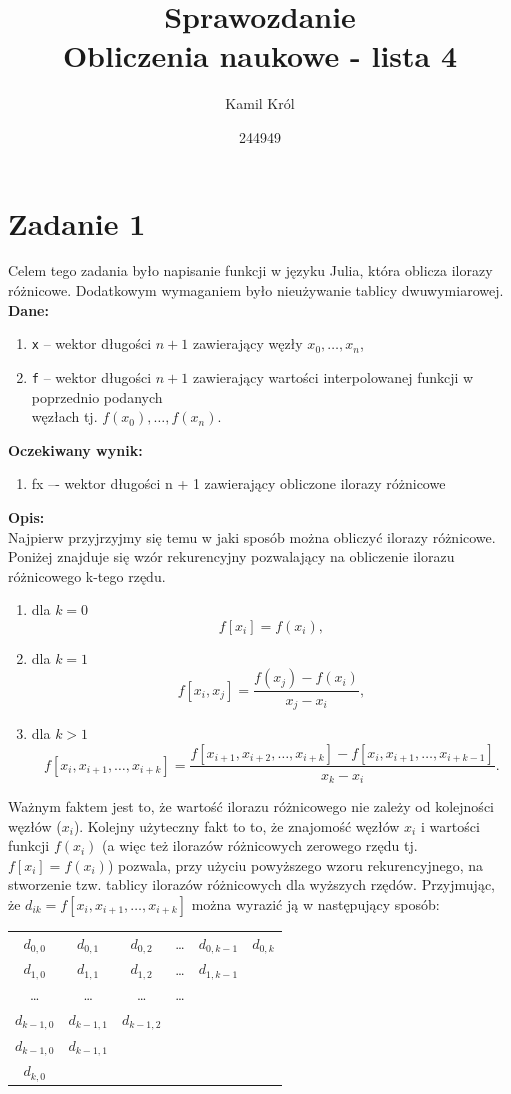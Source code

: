 \documentclass[]{article}
\title{
	Sprawozdanie \\
	\large 
	Obliczenia naukowe - lista 4}
\author{Kamil Król}
\date{244949}
\begin{document}
	
	\maketitle
	
	\section*{Zadanie 1}
	Celem tego zadania było napisanie funkcji w języku Julia, która oblicza ilorazy różnicowe. Dodatkowym wymaganiem było nieużywanie tablicy dwuwymiarowej.\\
	\textbf{Dane:}
	\begin{enumerate}[]
		\item \texttt{x} -- wektor długości $n+1$ zawierający węzły $x_0, \ldots, x_n$,
		\item \texttt{f} -- wektor długości $n+1$ zawierający wartości interpolowanej funkcji w poprzednio podanych\\ węzłach tj. $f(x_0), \ldots, f(x_n)$.
	\end{enumerate}
	\textbf{Oczekiwany wynik:}
	\begin{enumerate}[]
		\item fx –- wektor długości n + 1 zawierający obliczone ilorazy różnicowe
	\end{enumerate}
	\textbf{Opis:}\\
	Najpierw przyjrzyjmy się temu w jaki sposób można obliczyć ilorazy różnicowe.
	Poniżej znajduje się wzór rekurencyjny pozwalający na obliczenie ilorazu różnicowego k-tego rzędu.
	\begin{enumerate}[]
		\item dla $k = 0$  $$f[x_i] = f(x_i),$$
		\item dla $k = 1$  $$f[x_i,x_j] = \frac{f(x_j) - f(x_i)}{x_j - x_i},$$  
		\item dla $k > 1$  $$f[x_i,x_{i+1}, \ldots, x_{i+k}] = \frac{f[x_{i+1},x_{i+2}, \ldots, x_{i+k}] - f[x_{i}, x_{i+1}, \ldots, x_{i+k-1}]}{x_k - x_i}.$$
	\end{enumerate}
	Ważnym faktem jest to, że wartość ilorazu różnicowego nie zależy od kolejności węzłów ($x_i$). Kolejny użyteczny fakt to to, że 
	znajomość węzłów $x_i$ i wartości funkcji $f(x_i)$ (a więc też ilorazów różnicowych zerowego rzędu tj. $f[x_i] = f(x_i)$) pozwala, przy użyciu powyższego wzoru rekurencyjnego, na stworzenie tzw. tablicy ilorazów różnicowych dla wyższych rzędów. Przyjmując, że $d_{ik} = f[x_i,x_{i+1}, \ldots, x_{i+k}]$ można wyrazić ją w następujący sposób:
\begin{table}[!htbp]
	\centering
	\begin{tabular}{cccccc}
		$d_{0,0}$ & $d_{0,1}$ & $d_{0,2}$ & \ldots & $d_{0,k-1}$ & $d_{0,k}$ \\
		$d_{1,0}$ & $d_{1,1}$ & $d_{1,2}$ &\ldots & $d_{1,k-1}$ & \\
		\ldots & \ldots & \ldots & \ldots && \\
		$d_{k-1,0}$ & $d_{k-1,1}$ & $d_{k-1,2}$ &&& \\
		$d_{k-1,0}$ & $d_{k-1,1}$ &&&& \\
		$d_{k,0}$ &&&&& \\
	\end{tabular}
\end{table}
\end{document}
